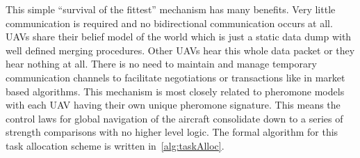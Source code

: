 This simple ``survival of the fittest'' mechanism has many benefits.  Very little communication is required and no bidirectional communication occurs at all.  UAVs share their belief model of the world which is just a static data dump with well defined merging procedures.  Other UAVs hear this whole data packet or they hear nothing at all.  There is no need to maintain and manage temporary communication channels to facilitate negotiations or transactions like in market based algorithms.  This mechanism is most closely related to pheromone models with each UAV having their own unique pheromone signature.  This means the control laws for global navigation of the aircraft consolidate down to a series of strength comparisons with no higher level logic.  The formal algorithm for this task allocation scheme is written in~\ref{alg:taskAlloc}.
